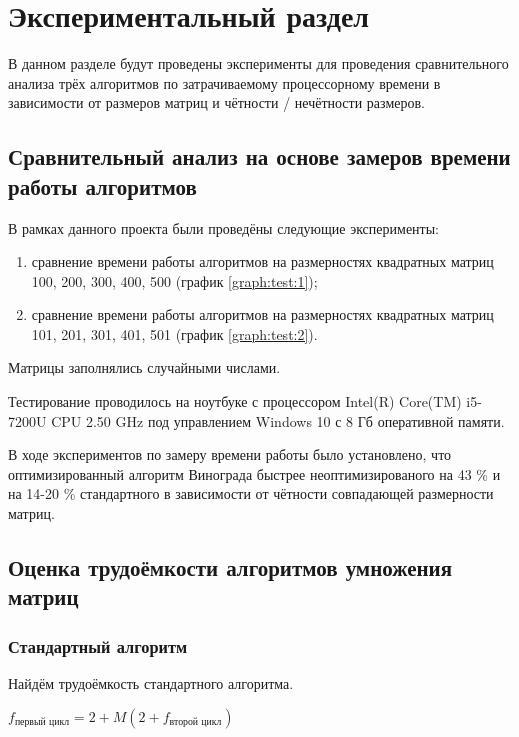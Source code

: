 \chapter{Экспериментальный раздел}
\label{cha:research}
    В данном разделе будут проведены эксперименты для проведения 
    сравнительного анализа трёх алгоритмов по затрачиваемому процессорному 
    времени в зависимости от размеров матриц и чётности / нечётности размеров.

    \section{Сравнительный анализ на основе замеров времени работы алгоритмов}
        В рамках данного проекта были проведёны следующие эксперименты:
        \begin{enumerate}
            \item сравнение времени работы алгоритмов на размерностях квадратных матриц 100, 200, 300, 400, 500 (график \ref{graph:test:1});
            \item сравнение времени работы алгоритмов на размерностях квадратных матриц 101, 201, 301, 401, 501 (график \ref{graph:test:2}).
        \end{enumerate}

        Матрицы заполнялись случайными числами.

        Тестирование проводилось на ноутбуке с процессором
        Intel(R) Core(TM) i5-7200U CPU 2.50 GHz \cite{processor-i5-7200u}
        под управлением Windows 10 с 8 Гб оперативной памяти.

        В ходе экспериментов по замеру времени работы было установлено, что 
        оптимизированный алгоритм Винограда быстрее неоптимизированого на 43 \% и
        на 14-20 \% стандартного в зависимости от чётности совпадающей размерности матриц.   

    \section{Оценка трудоёмкости алгоритмов умножения матриц}

        \subsection{Стандартный алгоритм}
            Найдём трудоёмкость стандартного алгоритма.
            
            $ f_\text{первый цикл} = 2 + M(2 + f_\text{второй цикл})$  

